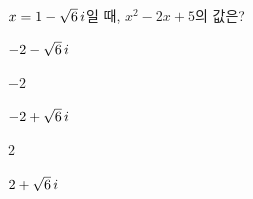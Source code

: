 $x=1-\sqrt{6}\mkern3mu i$일 때, $x^2-2x+5$의 값은?
\begin{choices32}{\rule[-3ex]{0pt}{8ex}$-2-\sqrt{6}\mkern3mu i$}{\rule[-3ex]{0pt}{8ex}$-2$}{\rule[-3ex]{0pt}{8ex}$-2+\sqrt{6}\mkern3mu i$}{\rule[-3ex]{0pt}{8ex}$2$}{\rule[-3ex]{0pt}{8ex}$2+\sqrt{6}\mkern3mu i$}\end{choices32}
